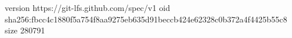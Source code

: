 version https://git-lfs.github.com/spec/v1
oid sha256:fbcc4c1880f5a754f8aa9275eb635d91beccb424e62328c0b372a4f4425b55c8
size 280791

